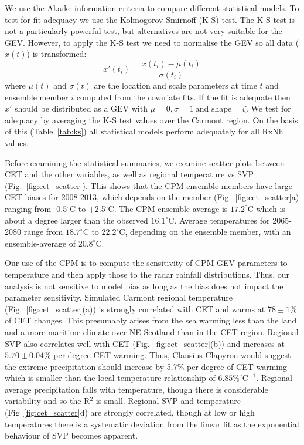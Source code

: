 \documentclass[11pt,a4paper]{article}
\begin{document}
 We  use the Akaike information criteria\parencite{akaike74aic} to compare different statistical models. To test for fit adequacy we use the  Kolmogorov-Smirnoff (K-S) test. The K-S test is not a particularly powerful test\parencite{stephens74fit}, but alternatives are not very suitable for the GEV. However, to apply the K-S test we need to normalise the GEV so all data ($x(t)$) is transformed:
\begin{equation}
	x'(t_i)=\frac{x(t_i)-\mu(t_i)}{\sigma(t_i)}
\end{equation}
where $\mu(t)$ and $\sigma(t)$ are the location and scale parameters at time $t$ and ensemble member $i$ computed from the covariate fits. 
If the fit is adequate then $x'$ should be distributed as a GEV with $\mu=0, \sigma=1\ \text{and shape}=\zeta$. We test for adequacy by averaging the K-S test values over the Carmont region. On the basis of this (Table~\ref{tab:ks}) all statistical models perform adequately for all RxNh values.  


Before examining  the statistical summaries, we examine scatter plots between CET and the other variables, as well as regional temperature vs SVP (Fig.~\ref{fig:cet_scatter}). This shows that the CPM ensemble members have large CET biases for 2008-2013, which depends on the member (Fig.~\ref{fig:cet_scatter}a) ranging from -0.5$^\circ$C to +2.5$^\circ$C. The CPM ensemble-average  is $17.2^\circ$C which is about a degree larger than the observed $16.1^\circ$C. Average temperatures for 2065-2080 range from $18.7^\circ$C to $22.2^\circ$C, depending on the ensemble member,  with an ensemble-average of  $20.8^\circ$C.

Our use of the CPM is to compute the sensitivity of CPM GEV parameters to temperature and then apply those to the radar rainfall distributions. Thus, our analysis is not sensitive to model bias as long as the bias does not impact the parameter sensitivity.  Simulated Carmont regional temperature (Fig.~\ref{fig:cet_scatter}(a)) is strongly correlated with CET and warms at $78\pm1$\% of CET changes. This presumably arises from the sea warming less than the land and a more maritime climate over NE Scotland than in the CET region. Regional SVP also correlates well with CET (Fig.~\ref{fig:cet_scatter}(b)) and increases at $5.70\pm 0.04$\% per degree CET warming. Thus, Clausius-Clapyron would suggest the extreme precipitation should increase by 5.7\% per degree of CET warming which is smaller than the local temperature relationship of $6.85\%^\circ\text{C}^{-1}$. Regional  average precipitation falls with temperature, though there is considerable variability and so the R$^2$ is small.  Regional SVP and temperature (Fig~\ref{fig:cet_scatter}d) are strongly correlated, though at low or high temperatures there is a systematic deviation from the linear fit as the exponential behaviour of SVP becomes apparent.   
 
\end{document}
